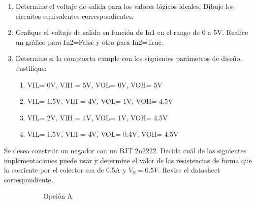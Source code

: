 \documentclass[11pt,fancy,lang=es]{elegantbook}
\begin{document}
\begin{problemset}
\begin{enumerate}
        \item Determine el voltaje de salida para los valores lógicos ideales. Dibuje los circuitos equivalentes correspondientes.
        \item Grafique el voltaje de salida en función de In1 en el rango de 0 a 5V. Realice un gráfico para In2=False y otro para In2=True.
        \item Determine si la compuerta cumple con los siguientes parámetros de diseño. Justifique:
              \begin{enumerate}
                  \item VIL= 0V, VIH = 5V, VOL= 0V, VOH= 5V
                  \item VIL= 1.5V, VIH = 4V, VOL= 1V, VOH= 4.5V
                  \item VIL= 2V, VIH = 4V, VOL= 1V, VOH= 4.5V
                  \item VIL= 1.5V, VIH = 4V, VOL= 0.4V, VOH= 4.5V
              \end{enumerate}
    \end{enumerate}




    \item Se desea construir un negador con un BJT 2n2222. Decida cuál de las siguientes implementaciones puede usar y determine el valor de  las resistencias de forma que la corriente por el colector sea de 0.5A y $V_S=0.5V$. Revise el datasheet correspondiente.


    \begin{figure}[!h]
        \centering

        \begin{subfigure}[b]{0.25\textwidth}
            \centering
            \caption{Opción A}
            \label{fig:five over x}
        \end{subfigure}
        \begin{subfigure}[b]{0.25\textwidth}
            \centering
\end{subfigure}
\end{figure}
\end{problemset}
\end{document}
